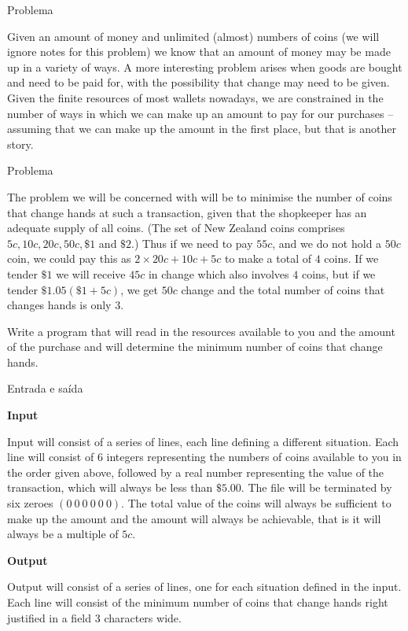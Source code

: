 
\begin{frame}[fragile]{Problema}

Given an amount of money and unlimited (almost) numbers of coins (we will ignore notes for this
problem) we know that an amount of money may be made up in a variety of ways. A more interesting
problem arises when goods are bought and need to be paid for, with the possibility that change may
need to be given. Given the finite resources of most wallets nowadays, we are constrained in the number
of ways in which we can make up an amount to pay for our purchases -- assuming that we can make
up the amount in the first place, but that is another story.

\end{frame}

\begin{frame}[fragile]{Problema}

The problem we will be concerned with will be to minimise the number of coins that change hands
at such a transaction, given that the shopkeeper has an adequate supply of all coins. (The set of
New Zealand coins comprises $5c, 10c, 20c, 50c, \$1$ and $\$2$.) Thus if we need to pay $55c$, and
we do not hold a $50c$ coin, we could pay this as $2\times 20c + 10c + 5c$ to make a total of $4$
coins. If we tender $\$1$ we will receive $45c$ in change which also involves $4$ coins, but if we
tender $\$1.05 (\$1 + 5c)$, we get $50c$ change and the total number of coins that changes hands is
only $3$.

Write a program that will read in the resources available to you and the amount of the purchase
and will determine the minimum number of coins that change hands.

\end{frame}

\begin{frame}[fragile]{Entrada e saída}

\textbf{Input}

Input will consist of a series of lines, each line defining a different situation. Each line will
consist of $6$ integers representing the numbers of coins available to you in the order given
above, followed by a real number representing the value of the transaction, which will always be
less than $\$5.00$. The file will be terminated by six zeroes $(0\ 0\ 0\ 0\ 0\ 0)$. The total value
of the coins will always be sufficient to make up the amount and the amount will always be
achievable, that is it will always be a multiple of $5c$.

\vspace{0.1in}

\textbf{Output}

Output will consist of a series of lines, one for each situation defined in the input. Each line
will consist of the minimum number of coins that change hands right justified in a field $3$
characters wide.

\end{frame}

